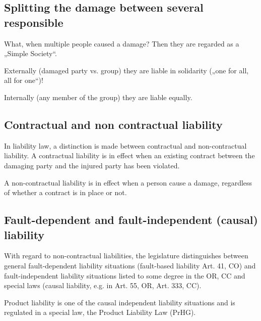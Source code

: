 \subsection{Splitting the damage between several responsible}
\begin{compactitem}
	\item What, when multiple people caused a damage? Then they are regarded as a „Simple Society“.
	\item Externally (damaged party vs. group) they are liable in solidarity („one for all, all for one“)!
	\item Internally (any member of the group) they are liable equally.
\end{compactitem}

\subsection{Contractual and non contractual liability}
\begin{compactitem}
	\item In liability law, a distinction is made between contractual and non-contractual liability. A contractual liability is in effect when an existing contract between the damaging party and the injured party has been violated.
	\item A non-contractual liability is in effect when a person cause a damage, regardless of whether a contract is in place or not.
\end{compactitem}

\subsection{Fault-dependent and fault-independent (causal) liability}
\begin{compactitem}
	\item With regard to non-contractual liabilities, the legislature distinguishes between general fault-dependent liability situations (fault-based liability Art. 41, CO) and fault-independent liability situations listed to some degree in the OR, CC and special laws (causal liability, e.g. in Art. 55, OR, Art. 333, CC).
	\item Product liability is one of the causal independent liability situations and is regulated in a special law, the Product Liability Law (PrHG).
\end{compactitem}

